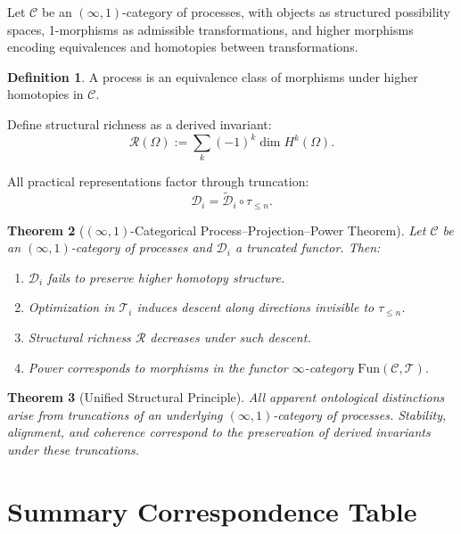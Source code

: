 \documentclass[11pt,a4paper]{article}
\newtheorem{theorem}{Theorem}[section]
\theoremstyle{definition}
\newtheorem{definition}[theorem]{Definition}
\theoremstyle{remark}
\begin{document}
Let $\mathcal{C}$ be an $(\infty,1)$-category of processes, with objects as structured possibility spaces, 1-morphisms as admissible transformations, and higher morphisms encoding equivalences and homotopies between transformations.

\begin{definition}
A process is an equivalence class of morphisms under higher homotopies in $\mathcal{C}$.
\end{definition}

Define structural richness as a derived invariant:
\[
\mathcal{R}(\Omega) := \sum_k (-1)^k \dim H^k(\Omega).
\]

All practical representations factor through truncation:
\[
\mathcal{D}_i = \tilde{\mathcal{D}}_i \circ \tau_{\leq n}.
\]

\begin{theorem}[$(\infty,1)$-Categorical Process--Projection--Power Theorem]
Let $\mathcal{C}$ be an $(\infty,1)$-category of processes and $\mathcal{D}_i$ a truncated functor. Then:
\begin{enumerate}
\item $\mathcal{D}_i$ fails to preserve higher homotopy structure.
\item Optimization in $\mathcal{T}_i$ induces descent along directions invisible to $\tau_{\leq n}$.
\item Structural richness $\mathcal{R}$ decreases under such descent.
\item Power corresponds to morphisms in the functor $\infty$-category $\mathrm{Fun}(\mathcal{C}, \mathcal{T})$.
\end{enumerate}
\end{theorem}

\begin{theorem}[Unified Structural Principle]
All apparent ontological distinctions arise from truncations of an underlying $(\infty,1)$-category of processes. Stability, alignment, and coherence correspond to the preservation of derived invariants under these truncations.
\end{theorem}

\section{Summary Correspondence Table}
\end{document}

